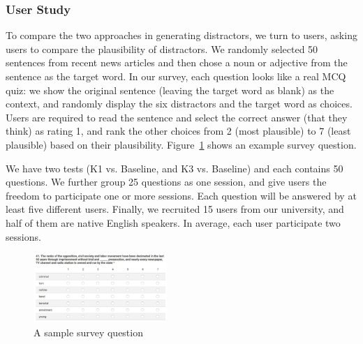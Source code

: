 \subsubsection{User Study}
To compare the two approaches in generating distractors, we turn to users, asking users to compare the plausibility of distractors.
 We randomly selected 50 sentences from recent news articles and then chose a noun or adjective from the sentence as the target word. In our survey, each question looks like a real MCQ quiz: we show the original sentence (leaving the target word as blank) as the context,  and randomly display the six distractors and the target word as choices. Users are required to read the sentence and select the correct answer (that they think) as rating 1, and 
 rank the other choices from 2 (most plausible) to 7 (least plausible) based on their plausibility. Figure~\ref{fig:distractor_1} shows an example survey question.
 

We have two tests (K1  vs. Baseline, and K3  vs. Baseline) and each contains 50 questions. We further group 25 questions as one session, and give users the freedom to participate one or more sessions. Each question will be answered by at least five different users.
Finally, we recruited 15 users from our university, and half of them are native English speakers. 
In average, each user participate two sessions.






\begin{figure}[ht]
   \centering
   \includegraphics[width=0.45\textwidth]{distractor_1.jpg}
   \caption{A sample survey question}
   \label{fig:distractor_1}
\end{figure}

